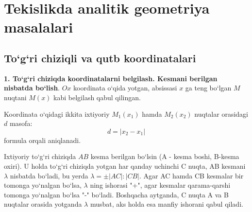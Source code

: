 \chapter{Tekislikda analitik geometriya masalalari}

\section{To`g`ri chiziqli va qutb koordinatalari}

\textbf{1. To`g`ri chiziqda koordinatalarni belgilash. Kesmani berilgan nisbatda bo`lish}. $Ox$ koordinata o`qida yotgan, absissasi $x$ ga teng bo`lgan $M$ nuqtani $M(x)$ kabi belgilash qabul qilingan. 

Koordinata o`qidagi ikkita ixtiyoriy $M_{1}(x_{1})$ hamda $M_{2}(x_{2})$ nuqtalar orasidagi $d$ masofa:
\begin{equation}
	d=|x_{2}-x_{1}|
	\label{1}
\end{equation}
formula orqali aniqlanadi.

Ixtiyoriy to`g`ri chiziqda $AB$ kesma berilgan bo`lsin (A - kesma boshi, B-kesma oxiri). U holda to`g`ri chiziqda yotgan har qanday uchinchi C nuqta, AB kesmani $\lambda$ nisbatda bo`ladi, bu yerda $\lambda=\pm|AC|:|CB|$. Agar AC hamda CB kesmalar bir tomonga yo`nalgan bo`lsa, $\lambda$ ning ishorasi "+", agar kesmalar qarama-qarshi tomonga yo`nalgan bo`lsa "-" bo`ladi. Boshqacha aytganda, C nuqta A va B nuqtalar orasida yotganda $\lambda$ musbat, aks holda esa manfiy ishorani qabul qiladi. 

